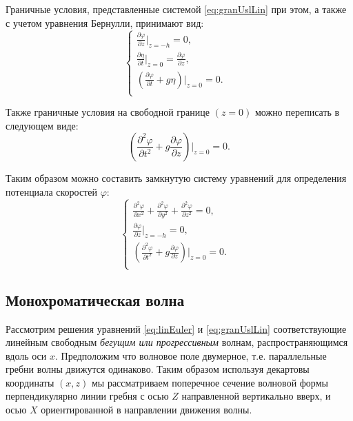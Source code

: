 Граничные условия, представленные системой \eqref{eq:granUslLin} при этом, а также с учетом уравнения Бернулли, принимают вид:
\begin{equation}\label{eq:granUslLin1}
\begin{cases}
    \frac{\partial \varphi}{\partial z}|_{z=-h}=0, &\\
    \frac{\partial \eta}{\partial t}|_{z=0}=\frac{\partial \varphi}{\partial z},&\\
    (\frac{\partial \varphi}{\partial t}+ g\eta)|_{z=0}=0.&\\
\end{cases}
\end{equation}

Также граничные условия на свободной границе $(z=0)$ можно переписать в следующем виде:
\begin{equation}\label{eq:granUslLin2}
    (\frac{\partial^2 \varphi}{\partial t^2}+ g\frac{\partial \varphi}{\partial z})|_{z=0}=0.
\end{equation}

Таким образом можно составить замкнутую систему уравнений для определения потенциала скоростей $\varphi$:
\begin{equation}\label{eq:granUslLin1}
\begin{cases}
    \frac{\partial^2 \varphi}{\partial x^2}+\frac{\partial^2 \varphi}{\partial y^2}+\frac{\partial^2 \varphi}{\partial z^2}=0, &\\
    \frac{\partial \varphi}{\partial z}|_{z=-h}=0, &\\
    (\frac{\partial^2 \varphi}{\partial t^2}+ g\frac{\partial \varphi}{\partial z})|_{z=0}=0. &\\
\end{cases}
\end{equation}

\subsection{Монохроматическая волна}
Рассмотрим решения уравнений \eqref{eq:linEuler} и \eqref{eq:granUslLin} соответствующие линейным свободным \emph{бегущим или прогрессивным} волнам, распространяющимся вдоль оси $x$. Предположим что волновое поле двумерное, т.е. параллельные гребни волны движутся одинаково. Таким образом используя декартовы координаты $(x,z)$ мы рассматриваем поперечное сечение волновой формы перпендикулярно линии гребня с осью $Z$ направленной вертикально вверх, и осью $X$ ориентированной в направлении движения волны.

